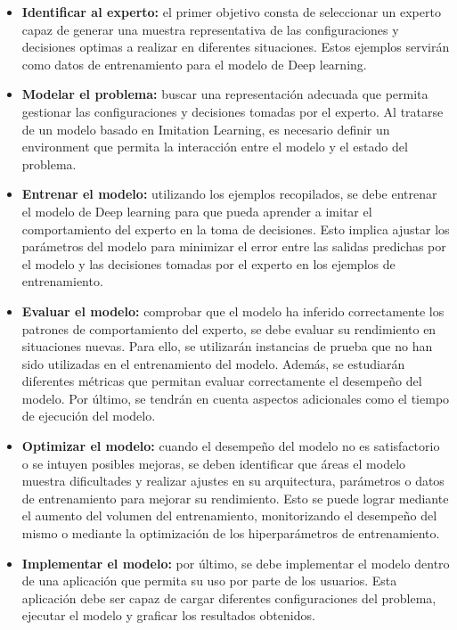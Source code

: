 \begin{itemize}
\item \textbf{Identificar al experto:} el primer objetivo consta de seleccionar un
experto capaz de generar una muestra representativa de las configuraciones y decisiones 
optimas a realizar en diferentes situaciones. Estos ejemplos servirán como datos 
de entrenamiento para el modelo de Deep learning.
\item \textbf{Modelar el problema:} buscar una representación adecuada que permita gestionar 
las configuraciones y decisiones tomadas por el experto. Al tratarse de un modelo basado en 
Imitation Learning, es necesario definir un environment que permita la interacción entre el 
modelo y el estado del problema.
\item \textbf{Entrenar el modelo:} utilizando los ejemplos recopilados, se debe entrenar 
el modelo de Deep learning para que pueda aprender a imitar el comportamiento 
del experto en la toma de decisiones. Esto implica ajustar los parámetros del modelo para 
minimizar el error entre las salidas predichas por el modelo y las decisiones tomadas por 
el experto en los ejemplos de entrenamiento.
\item \textbf{Evaluar el modelo:} comprobar que el modelo ha inferido correctamente
los patrones de comportamiento del experto, se debe evaluar su rendimiento en situaciones
nuevas. Para ello, se utilizarán instancias de prueba que no han sido utilizadas en el
entrenamiento del modelo. Además, se estudiarán diferentes métricas que permitan evaluar 
correctamente el desempeño del modelo. Por último, se tendrán en cuenta aspectos adicionales 
como el tiempo de ejecución del modelo.
\item \textbf{Optimizar el modelo:} cuando el desempeño del modelo no es satisfactorio o 
se intuyen posibles mejoras, se deben identificar que áreas el modelo muestra dificultades y realizar ajustes 
en su arquitectura, parámetros o datos de entrenamiento para mejorar su rendimiento. Esto 
se puede lograr mediante el aumento del volumen del entrenamiento, monitorizando el desempeño
del mismo o mediante la optimización de los hiperparámetros de entrenamiento.
\item \textbf{Implementar el modelo:} por último, se debe implementar el modelo dentro de
una aplicación que permita su uso por parte de los usuarios. Esta aplicación debe ser capaz
de cargar diferentes configuraciones del problema, ejecutar el modelo y graficar los resultados
obtenidos.
\end{itemize}

